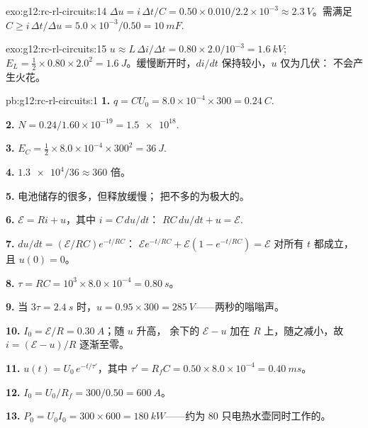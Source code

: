 \begin{solution}{exo:g12:rc-rl-circuits:14}
$\Delta u = i\,\Delta t/C = 0.50 \times 0.010/2.2\times10^{-3} \approx
\qty{2.3}{V}$。需满足 $C \geq i\,\Delta t/\Delta u =
5.0\times10^{-3}/0.50 = \qty{10}{mF}$.
\end{solution}

\begin{solution}{exo:g12:rc-rl-circuits:15}
$u \approx L\,\Delta i/\Delta t = 0.80 \times 2.0/10^{-3} =
\qty{1.6}{kV}$; $E_L = \tfrac12 \times 0.80 \times 2.0^2 =
\qty{1.6}{J}$。缓慢断开时，$di/dt$ 保持较小，$u$ 仅为几伏：
不会产生火花。
\end{solution}

\begin{solution}{pb:g12:rc-rl-circuits:1}
\textbf{1.} $q = CU_0 = 8.0\times10^{-4} \times 300 = \qty{0.24}{C}$.

\textbf{2.} $N = 0.24/1.60\times10^{-19} = \num{1.5e18}$.

\textbf{3.} $E_C = \tfrac12 \times 8.0\times10^{-4} \times 300^2 =
\qty{36}{J}$.

\textbf{4.} $\num{1.3e4}/36 \approx 360$ 倍。

\textbf{5.} 电池储存的很多，但释放缓慢；
把不多的为极大的\emph{}。

\textbf{6.} $\mathcal{E} = Ri + u$，其中 $i = C\,du/dt$：
$RC\,du/dt + u = \mathcal{E}$.

\textbf{7.} $du/dt = (\mathcal{E}/RC)e^{-t/RC}$：
$\mathcal{E}e^{-t/RC} + \mathcal{E}(1 - e^{-t/RC}) = \mathcal{E}$
对所有 $t$ 都成立，且 $u(0) = 0$。

\textbf{8.} $\tau = RC = 10^3 \times 8.0\times10^{-4} = \qty{0.80}{s}$。

\textbf{9.} 当 $3\tau = \qty{2.4}{s}$ 时，$u = 0.95 \times 300 =
\qty{285}{V}$——两秒的嗡嗡声。

\textbf{10.} $I_0 = \mathcal{E}/R = \qty{0.30}{A}$；随 $u$ 升高，
余下的 $\mathcal{E} - u$ 加在 $R$ 上，随之减小，故 $i = (\mathcal{E}-u)/R$
逐渐至零。

\textbf{11.} $u(t) = U_0\,e^{-t/\tau'}$，其中 $\tau' = R_f C =
0.50 \times 8.0\times10^{-4} = \qty{0.40}{ms}$。

\textbf{12.} $I_0 = U_0/R_f = 300/0.50 = \qty{600}{A}$。

\textbf{13.} $P_0 = U_0 I_0 = 300 \times 600 = \qty{180}{kW}$——约为
$80$ 只电热水壶同时工作的。


\end{solution}
